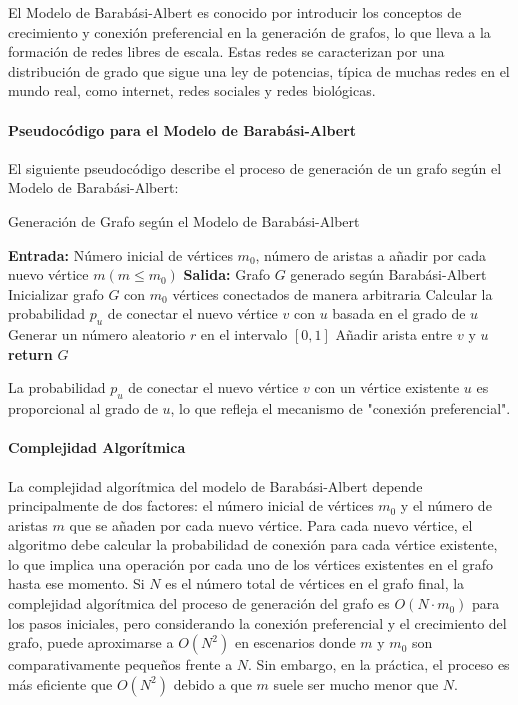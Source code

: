 \documentclass[12pt]{book}
\begin{document}
El Modelo de Barabási-Albert es conocido por introducir los conceptos de crecimiento y conexión preferencial en la generación de grafos, lo que lleva a la formación de redes libres de escala. Estas redes se caracterizan por una distribución de grado que sigue una ley de potencias, típica de muchas redes en el mundo real, como internet, redes sociales y redes biológicas.

\paragraph{Pseudocódigo para el Modelo de Barabási-Albert}

El siguiente pseudocódigo describe el proceso de generación de un grafo según el Modelo de Barabási-Albert:
\newpage

\begin{algorithm}
\caption{Generación de Grafo según el Modelo de Barabási-Albert}
\begin{algorithmic}[1]
\State \textbf{Entrada:} Número inicial de vértices $m_0$, número de aristas a añadir por cada nuevo vértice $m (m \leq m_0)$
\State \textbf{Salida:} Grafo $G$ generado según Barabási-Albert
    \State Inicializar grafo $G$ con $m_0$ vértices conectados de manera arbitraria
            \State Calcular la probabilidad $p_u$ de conectar el nuevo vértice $v$ con $u$ basada en el grado de $u$
            \State Generar un número aleatorio $r$ en el intervalo $[0, 1]$
                \State Añadir arista entre $v$ y $u$
            \EndIf
        \EndFor
    \EndFor
    \State \textbf{return} $G$
\EndProcedure
\end{algorithmic}
\end{algorithm}

La probabilidad $p_u$ de conectar el nuevo vértice $v$ con un vértice existente $u$ es proporcional al grado de $u$, lo que refleja el mecanismo de "conexión preferencial".

\paragraph{Complejidad Algorítmica}

La complejidad algorítmica del modelo de Barabási-Albert depende principalmente de dos factores: el número inicial de vértices $m_0$ y el número de aristas $m$ que se añaden por cada nuevo vértice. Para cada nuevo vértice, el algoritmo debe calcular la probabilidad de conexión para cada vértice existente, lo que implica una operación por cada uno de los vértices existentes en el grafo hasta ese momento. Si $N$ es el número total de vértices en el grafo final, la complejidad algorítmica del proceso de generación del grafo es $O(N \cdot m_0)$ para los pasos iniciales, pero considerando la conexión preferencial y el crecimiento del grafo, puede aproximarse a $O(N^2)$ en escenarios donde $m$ y $m_0$ son comparativamente pequeños frente a $N$. Sin embargo, en la práctica, el proceso es más eficiente que $O(N^2)$ debido a que $m$ suele ser mucho menor que $N$.
\end{document}
